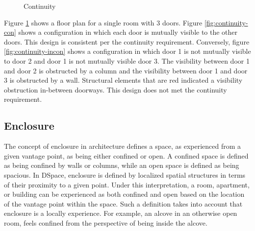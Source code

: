 \documentclass[12pt]{ucthesis}
\begin{document}
\begin{figure}[H]
 \centering
  \hspace{30 mm}
 \caption{Continuity}
\label{continuity}
\end{figure}

Figure \ref{continuity} shows a floor plan for a single room with 3 doors. Figure \ref{fig:continuity-con} shows a configuration in which each door is mutually visible to the other doors. This design is consistent per the continuity requirement. Conversely, figure \ref{fig:continuity-incon} shows a configuration in which door 1 is not mutually visible to door 2 and door 1 is not mutually visible door 3. The visibility between door 1 and door 2 is obstructed by a column and the visibility between door 1 and door 3 is obstructed by a wall. Structural elements that are red indicated a visibility obstruction in-between doorways. This design does not met the continuity requirement. 


\subsection{Enclosure} 
The concept of enclosure in architecture defines a space, as experienced from a given vantage point, as being either confined or open. A confined space is defined as being confined by walls or columns, while an open space is defined as being spacious. In DSpace, enclosure is defined by localized spatial structures in terms of their proximity to a given point. Under this interpretation, a room, apartment, or building can be experienced as both confined and open based on the location of the vantage point within the space. Such a definition takes into account that enclosure is a locally experience. For example, an alcove in an otherwise open room, feels confined from the perspective of being inside the alcove.
\end{document}
